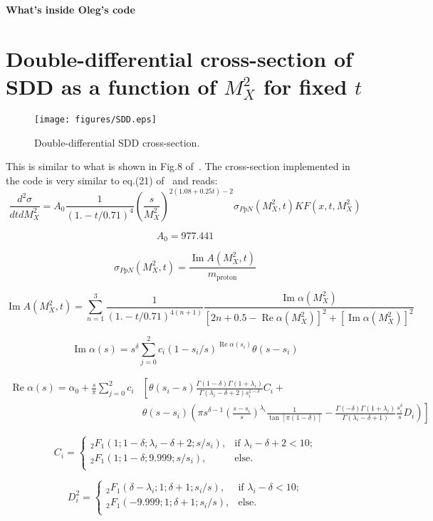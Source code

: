 \documentclass[12pt]{article}
\renewcommand{\Re}{\operatorname{Re}}
\renewcommand{\Im}{\operatorname{Im}}
\begin{document}
\vskip 0.5cm \centerline{\bf\Large What's inside Oleg's code}
\vskip 1cm

\section{Double-differential cross-section of SDD as a function of $M_X^2$ for fixed $t$}
\begin{figure}[!h]
\centering
\texttt{[image: figures/SDD.eps]}
\caption{Double-differential SDD cross-section.}
\label{fig:diagrams}
\end{figure}
This is similar to what is shown in Fig.8 of~\cite{Jenkovszky11}.
The cross-section implemented in the code is very similar to eq.(21) of~\cite{Jenkovszky11} and reads:
$$
\frac{d^2\sigma}{dt dM_X^2}=A_0 \frac{1}{(1. - t/0.71)^4} \left(\frac{s}{M_X^2}\right)^{2(1.08 + 0.25t) - 2} \sigma_{PpN}(M_X^2,t) KF(x,t,M_X^2)
$$

$$
A_0=977.441
$$

$$
\sigma_{PpN}(M_X^2,t)=\frac{\Im A(M_X^2,t)}{m_\textrm{proton}}
$$

$$
\Im A(M_X^2,t) = \sum_{n=1}^{3}\frac{1}{(1. - t/0.71)^{4(n+1)}} \frac{\Im\alpha(M_X^2)}{\left[2 n +0.5-\Re\alpha(M_X^2)\right]^2+\left[\Im\alpha(M_X^2)\right]^2}
$$

$$
\Im\alpha(s) = s^\delta \sum_{j=0}^{2} c_i (1-s_i/s)^{\Re\alpha(s_i)} \theta(s-s_i) 
$$

\begin{equation*}
\begin{split}
\Re\alpha(s) =  \alpha_0 + 
\frac{s}{\pi}
\sum_{j=0}^{2} c_i
  &\left[\theta(s_i-s)\frac{\Gamma(1-\delta) \Gamma(1+\lambda_i)}{\Gamma(\lambda_i-\delta+2) s_i^{1-\delta}} C_i  + \right. \\ 
  &\left.\theta(s-s_i) \left(\pi s^{\delta-1} \left(\frac{s-s_i}{s}\right)^{\lambda_i} \frac{1}{\tan{\left[\pi (1-\delta)\right]}} - \frac{\Gamma(-\delta) \Gamma(1+\lambda_i)}{\Gamma(\lambda_i-\delta+1)} \frac{s_i^\delta}{s} D_i\right)  \right]
\end{split}
\end{equation*}

$$
C_i=\begin{cases}
_2F_1(1; 1-\delta; \lambda_i-\delta +2; s/s_i),&\text{if $\lambda_i-\delta +2 < 10$;}\\
_2F_1(1; 1-\delta; 9.999; s/s_i),&\text{else.}\\
\end{cases}
$$

$$
D^2_i=\begin{cases}
_2F_1(\delta-\lambda_i; 1; \delta+1;  s_i/s),&\text{if $\lambda_i-\delta < 10$;}\\
_2F_1(-9.999; 1; \delta+1; s_i/s),&\text{else.}\\
\end{cases}
$$
\end{document}
